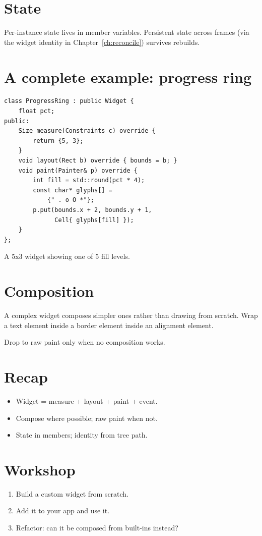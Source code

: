 \section{State}

Per-instance state lives in member variables. Persistent
state across frames (via the widget identity in
Chapter~\ref{ch:reconcile}) survives rebuilds.

\section{A complete example: progress ring}

\begin{lstlisting}
class ProgressRing : public Widget {
    float pct;
public:
    Size measure(Constraints c) override {
        return {5, 3};
    }
    void layout(Rect b) override { bounds = b; }
    void paint(Painter& p) override {
        int fill = std::round(pct * 4);
        const char* glyphs[] =
            {" . o O *"};
        p.put(bounds.x + 2, bounds.y + 1,
              Cell{ glyphs[fill] });
    }
};
\end{lstlisting}

A 5x3 widget showing one of 5 fill levels.

\section{Composition}

A complex widget composes simpler ones rather than drawing
from scratch. Wrap a text element inside a border element
inside an alignment element.

Drop to raw paint only when no composition works.

\section{Recap}

\begin{recap}
\begin{itemize}[leftmargin=*]
  \item Widget = measure + layout + paint + event.
  \item Compose where possible; raw paint when not.
  \item State in members; identity from tree path.
\end{itemize}
\end{recap}

\section*{Workshop}

\begin{enumerate}[leftmargin=*]
  \item Build a custom widget from scratch.
  \item Add it to your app and use it.
  \item Refactor: can it be composed from built-ins
    instead?
\end{enumerate}
